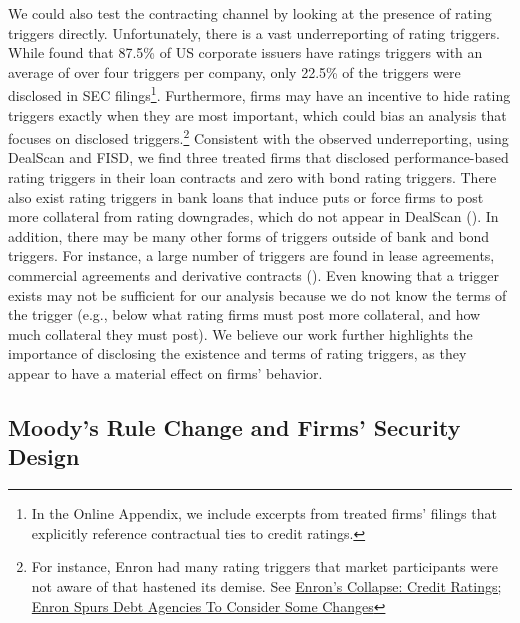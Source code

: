 \documentclass[a4paper, 12pt]{article}
\begin{document}
We could also test the contracting channel by looking at the presence of rating triggers directly. Unfortunately, there is a vast underreporting of rating triggers. While \cite{moodytrigger2} found that 87.5\% of US corporate issuers have ratings triggers with an average of over four triggers per company, only 22.5\% of the triggers were disclosed in SEC filings\footnote{In the Online Appendix, we include excerpts from treated firms' filings that explicitly reference contractual ties to credit ratings.}. Furthermore, firms may have an incentive to hide rating triggers exactly when they are most important, which could bias an analysis that focuses on disclosed triggers.\footnote{For instance, Enron had many rating triggers that market participants were not aware of that hastened its demise. See \href{https://www.nytimes.com/2002/01/22/business/enron-s-collapse-credit-ratings-enron-spurs-debt-agencies-consider-some-changes.html}{Enron's Collapse: Credit Ratings; Enron Spurs Debt Agencies To Consider Some Changes}} Consistent with the observed underreporting, using DealScan and FISD, we find three treated firms that disclosed performance-based rating triggers in their loan contracts and zero with bond rating triggers. There also exist rating triggers in bank loans that induce puts or force firms to post more collateral from rating downgrades, which do not appear in DealScan (\citealp{moodytrigger2}). In addition, there may be many other forms of triggers outside of bank and bond triggers. For instance, a large number of triggers are found in lease agreements, commercial agreements and derivative contracts (\citealp{moodytrigger2}). Even knowing that a trigger exists may not be sufficient for our analysis because we do not know the terms of the trigger (e.g., below what rating firms must post more collateral, and how much collateral they must post). We believe our work further highlights the importance of disclosing the existence and terms of rating triggers, as they appear to have a material effect on firms' behavior.


\subsection{Moody's Rule Change and Firms' Security Design}\label{sec:secdesign}
\end{document}
